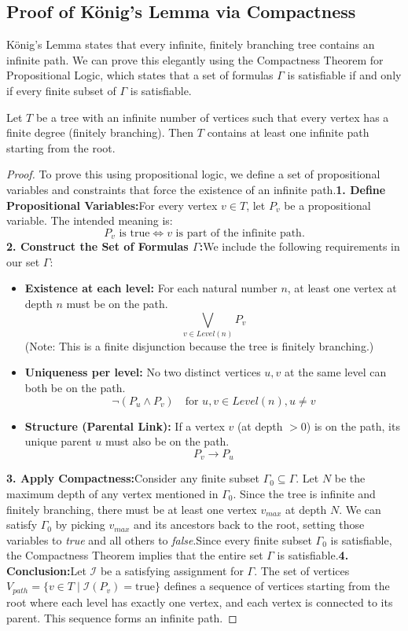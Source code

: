 \documentclass{article}
\newtheorem{theorem}{Theorem}[section]
\let\oldtheorem\theorem
\let\endoldtheorem\endtheorem
\renewenvironment{theorem}
  {\begin{tcolorbox}[
      colback=yellow!6,
      colframe=yellow!60!black,
      boxrule=0.6pt,
      arc=2pt,
      left=6pt,right=6pt,top=4pt,bottom=4pt,
      parbox=false
    ]\oldtheorem}
  {\endoldtheorem\end{tcolorbox}}
\begin{document}
\subsection{Proof of König's Lemma via Compactness}König's Lemma states that every infinite, finitely branching tree contains an infinite path. We can prove this elegantly using the Compactness Theorem for Propositional Logic, which states that a set of formulas $\Gamma$ is satisfiable if and only if every finite subset of $\Gamma$ is satisfiable.\begin{theorem}[König's Lemma]Let $T$ be a tree with an infinite number of vertices such that every vertex has a finite degree (finitely branching). Then $T$ contains at least one infinite path starting from the root.\end{theorem}\begin{proof}To prove this using propositional logic, we define a set of propositional variables and constraints that force the existence of an infinite path.\textbf{1. Define Propositional Variables:}For every vertex $v \in T$, let $P_v$ be a propositional variable. The intended meaning is:$$ P_v \text{ is true} \iff v \text{ is part of the infinite path.} $$\textbf{2. Construct the Set of Formulas $\Gamma$:}We include the following requirements in our set $\Gamma$:\begin{itemize}\item \textbf{Existence at each level:} For each natural number $n$, at least one vertex at depth $n$ must be on the path.$$ \bigvee_{v \in Level(n)} P_v $$(Note: This is a finite disjunction because the tree is finitely branching.)\item \textbf{Uniqueness per level:} No two distinct vertices $u, v$ at the same level can both be on the path.$$ \neg (P_u \land P_v) \quad \text{for } u, v \in Level(n), u \neq v $$\item \textbf{Structure (Parental Link):} If a vertex $v$ (at depth $> 0$) is on the path, its unique parent $u$ must also be on the path.$$ P_v \rightarrow P_u $$\end{itemize}\textbf{3. Apply Compactness:}Consider any finite subset $\Gamma_0 \subseteq \Gamma$. Let $N$ be the maximum depth of any vertex mentioned in $\Gamma_0$. Since the tree is infinite and finitely branching, there must be at least one vertex $v_{max}$ at depth $N$. We can satisfy $\Gamma_0$ by picking $v_{max}$ and its ancestors back to the root, setting those variables to \textit{true} and all others to \textit{false}.Since every finite subset $\Gamma_0$ is satisfiable, the Compactness Theorem implies that the entire set $\Gamma$ is satisfiable.\textbf{4. Conclusion:}Let $\mathcal{I}$ be a satisfying assignment for $\Gamma$. The set of vertices $V_{path} = \{v \in T \mid \mathcal{I}(P_v) = \text{true}\}$ defines a sequence of vertices starting from the root where each level has exactly one vertex, and each vertex is connected to its parent. This sequence forms an infinite path.\end{proof}
\end{document}
